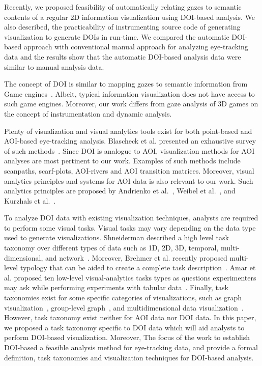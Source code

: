 Recently, we proposed feasibility of automatically relating gazes to semantic contents of a regular 2D information visualization using DOI-based analysis. We also described, the practicability of instrumenting source code of generating visualization to generate DOIs in run-time. We compared the automatic DOI-based approach with conventional manual approach for analyzing eye-tracking data and the results show that the automatic DOI-based analysis data were similar to manual analysis data.

The concept of DOI is similar to mapping gazes to semantic information from Game engines~\cite{sundstedt2013visual}. Albeit, typical information visualization does not have access to such game engines. Moreover, our work differs from gaze analysis of 3D games on the concept of instrumentation and dynamic analysis. 

Plenty of visualization and visual analytics tools exist for both point-based and AOI-based eye-tracking analysis. Blascheck et al. presented an exhaustive survey of such methods~\cite{blascheck2014state}. Since DOI is analogue to AOI, visualization methods for AOI analyses are most pertinent to our work. Examples of such methods include scanpaths, scarf-plots, AOI-rivers and AOI transition matrices. Moreover, visual analytics principles and systems for AOI data is also relevant to our work. Such analytics principles are proposed by Andrienko et al.~\cite{andrienko2012visual}, Weibel et al.~\cite{weibel2012let}, and Kurzhals et al.~\cite{kurzhals2014iseecube}. 

To analyze DOI data with existing visualization techniques, analysts are required to perform some visual tasks. Visual tasks may vary depending on the data type used to generate visualizations. Shneiderman described a high level task taxonomy over different types of data such as 1D, 2D, 3D, temporal, multi-dimensional, and network~\cite{shneiderman1996eyes}. Moreover, Brehmer et al. recently proposed multi-level typology that can be aided to create a complete task description~\cite{brehmer2013multi}. Amar et al. proposed ten low-level visual-analytics tasks types as questions experimenters may ask while performing experiments with tabular data~\cite{amar2005low}. Finally, task taxonomies exist for some specific categories of visualizations, such as graph visualization~\cite{lee2006task}, group-level graph~\cite{saket2014group}, and multidimensional data visualization~\cite{ward2002taxonomy}. However, task taxonomy exist neither for AOI data nor DOI data. In this paper, we proposed a task taxonomy specific to DOI data which will aid analysts to perform DOI-based visualization. Moreover, The focus of the work to establish DOI-based a feasible analysis method for eye-tracking data, and provide a formal definition, task taxonomies and visualization techniques for DOI-based analysis. 

